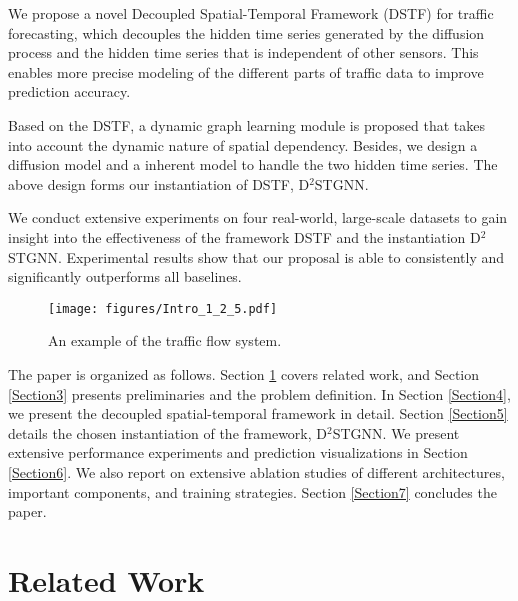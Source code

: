 \documentclass[sigconf, nonacm]{acmart}
\begin{document}
\begin{itemize}
    \item 
    {\color{black}We propose a novel Decoupled Spatial-Temporal Framework (DSTF) for traffic forecasting, which decouples the hidden time series generated by the diffusion process and the hidden time series that is independent of other sensors.
    This enables more precise modeling of the different parts of traffic data to improve prediction accuracy.
    \item
    Based on the DSTF, a dynamic graph learning module is proposed that takes into account the dynamic nature of spatial dependency.
    Besides, we design a diffusion model and a inherent model to handle the two hidden time series.
    The above design forms our instantiation of DSTF, D$^2$STGNN.}
    
    \item We conduct extensive experiments on four real-world, large-scale datasets to gain insight into the effectiveness of {\color{black}the framework DSTF and the instantiation D$^2$STGNN}. 
    Experimental results show that our proposal is able to consistently {\color{black}and significantly} outperforms all baselines.
\end{itemize}

\begin{figure}[t]
  \centering
\texttt{[image: figures/Intro\_1\_2\_5.pdf]}
  \caption{\color{black}An example of the traffic flow system.
  }
  \label{Intro1}
\end{figure}


The paper is organized as follows.
Section \ref{Section2} covers related work, and Section \ref{Section3} presents preliminaries and the problem definition.
In Section \ref{Section4}, we present the decoupled spatial-temporal framework in detail.
Section \ref{Section5} details the chosen instantiation of the framework, D$^2$STGNN.
We {\color{black}present extensive performance experiments and prediction visualizations in Section \ref{Section6}. 
We also report on extensive ablation studies of different architectures, important components, and training strategies.}
Section \ref{Section7} concludes the paper. \section{Related Work}
\label{Section2}
\end{document}
